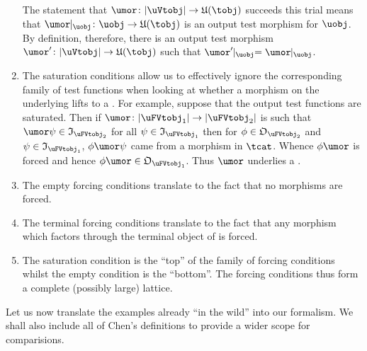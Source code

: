 \documentclass[%
12pt,%
arxiv,%
defaults
]{myclass}
\begin{document}
\begin{remark}
\begin{enumerate}
\begin{centre}
\end{centre}

The statement that \(\umor \colon \forfunc[\uVtobj] \to \ufunc(\tobj)\) succeeds this trial means that \(\umor\restrict_{\uobj} \colon \uobj \to \ufunc(\tobj)\) is an output test morphism for \(\uobj\).
By definition, therefore, there is an output test morphism \(\umor' \colon \forfunc[\uVtobj] \to \ufunc(\tobj)\) such that \(\umor' \restrict_{\uobj} = \umor\restrict_{\uobj}\).

\item The saturation conditions allow us to effectively ignore the corresponding family of test functions when looking at whether a morphism on the underlying \uobjs lifts to a \uFVtmoralt.
For example, suppose that the output test functions are saturated.
Then if \(\umor \colon \forfunc[\uFVtobj_1] \to \forfunc[\uFVtobj_2]\) is such that \(\umor \ifn \in \itest_{\uFVtobj_2}\) for all \(\ifn \in \itest_{\uFVtobj_1}\) then for \(\ofn \in \otest_{\uFVtobj_2}\) and \(\ifn \in \itest_{\uFVtobj_1}\), \(\ofn \umor \ifn\) came from a morphism in \(\tcat\).
Whence \(\ofn \umor\) is forced and hence \(\ofn \umor \in \otest_{\uFVtobj_1}\).
Thus \(\umor\) underlies a \uFVtmor.

\item The empty forcing conditions translate to the fact that no morphisms are forced.

\item The terminal forcing conditions translate to the fact that any morphism which factors through the terminal object of \tcat is forced.

\item The saturation condition is the ``top'' of the family of forcing conditions whilst the empty condition is the ``bottom''.
The forcing conditions thus form a complete (possibly large) lattice.
\end{enumerate}
\end{remark}
\medskip

Let us now translate the examples already ``in the wild'' into our formalism.
We shall also include all of Chen's definitions to provide a wider scope for comparisions.
\end{document}
